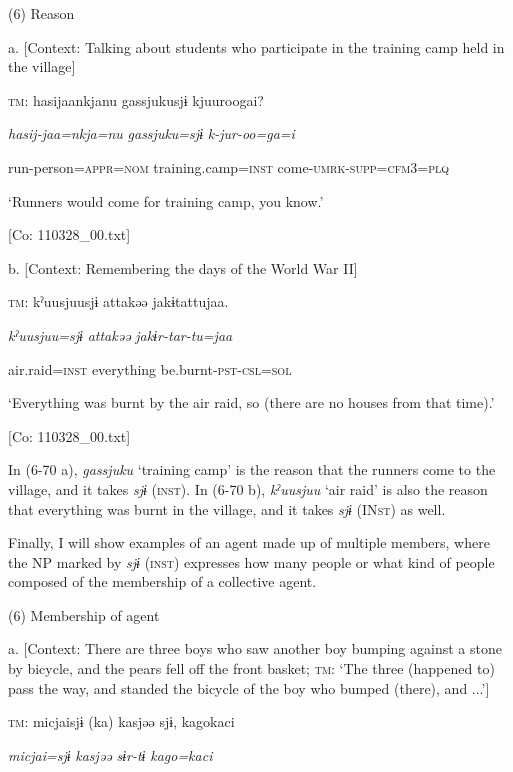 (6)  Reason

  a.  [Context: Talking about students who participate in the training camp held in the village]

    \textsc{tm}:  hasijaankjanu  {\textbar}gassjuku{\textbar}sjɨ  kjuuroogai?

      \textit{hasij-jaa=nkja=nu}  \textit{gassjuku=sjɨ}  \textit{k-jur-oo=ga=i}

      run-person=\textsc{appr}=\textsc{nom}  training.camp=\textsc{inst}  come-\textsc{umrk}-\textsc{supp}=\textsc{cfm}3=\textsc{plq}

      ‘Runners would come for training camp, you know.’

      [Co: 110328\_00.txt]

  b.  [Context: Remembering the days of the World War II]

    \textsc{tm}:  kˀuusjuusjɨ  attakəə  jakɨtattujaa.

      \textit{kˀuusjuu=sjɨ}  \textit{attakəə}  \textit{jakɨr-tar-tu=jaa}

      air.raid=\textsc{inst}  everything  be.burnt-\textsc{pst}-\textsc{csl}=\textsc{sol}

      ‘Everything was burnt by the air raid, so (there are no houses from that time).’

      [Co: 110328\_00.txt]

In (6-70 a), \textit{gassjuku} ‘training camp’ is the reason that the runners come to the village, and it takes \textit{sjɨ} (\textsc{inst}). In (6-70 b), \textit{kˀuusjuu} ‘air raid’ is also the reason that everything was burnt in the village, and it takes \textit{sjɨ} (IN\textsc{st}) as well.

Finally, I will show examples of an agent made up of multiple members, where the NP marked by \textit{sjɨ} (\textsc{inst}) expresses how many people or what kind of people composed of the membership of a collective agent.

(6)  Membership of agent

  a.  [Context: There are three boys who saw another boy bumping against a stone by bicycle, and the pears fell off the front basket; \textsc{tm}: ‘The three (happened to) pass the way, and standed the bicycle of the boy who bumped (there), and ...’]

    \textsc{tm}:  micjaisjɨ  (ka)  kasjəə  sjɨ,  kagokaci

      \textit{micjai=sjɨ}    \textit{kasjəə}  \textit{sɨr-tɨ}  \textit{kago=kaci}

